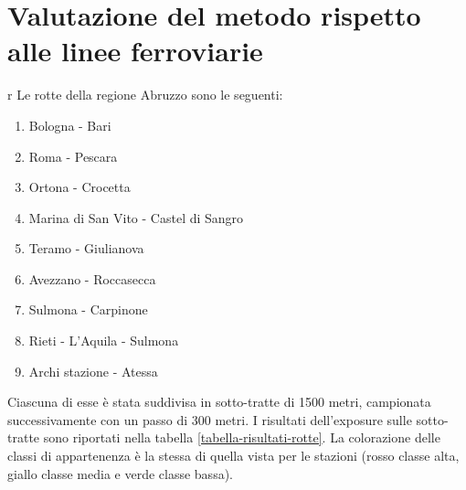 
\chapter{Valutazione del metodo rispetto alle linee ferroviarie} r
Le rotte della regione Abruzzo sono le seguenti:
\begin{enumerate}
	\item Bologna - Bari
	\item Roma - Pescara
	\item Ortona - Crocetta
	\item Marina di San Vito - Castel di Sangro
	\item Teramo - Giulianova
	\item Avezzano - Roccasecca
	\item Sulmona - Carpinone
	\item Rieti - L'Aquila - Sulmona
	\item Archi stazione - Atessa
\end{enumerate}
Ciascuna di esse è stata suddivisa in sotto-tratte di 1500 metri, campionata successivamente con un passo di 300 metri. 
I risultati dell'exposure sulle sotto-tratte sono riportati nella tabella \ref{tabella-risultati-rotte}. La colorazione delle classi di appartenenza è la stessa di quella vista per le stazioni (rosso classe alta, giallo classe media e verde classe bassa).

